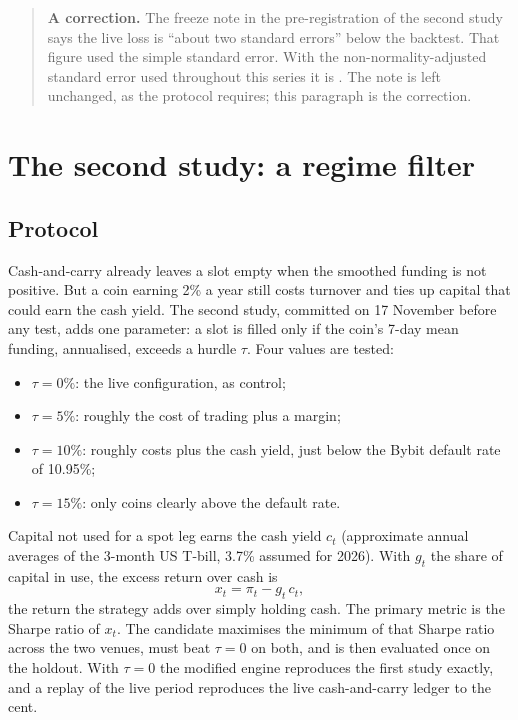 \documentclass[11pt,a4paper]{article}
\begin{document}
\begin{quote}\small
\textbf{A correction.} The freeze note in the pre-registration of the second study
says the live loss is ``about two standard errors'' below the backtest. That figure
used the simple standard error. With the non-normality-adjusted standard error used
throughout this series it is \LiveZ. The note is left unchanged, as the protocol
requires; this paragraph is the correction.
\end{quote}

\section{The second study: a regime filter}\label{sec:study2}

\subsection{Protocol}

Cash-and-carry already leaves a slot empty when the smoothed funding is not positive.
But a coin earning 2\% a year still costs turnover and ties up capital that could earn
the cash yield. The second study, committed on 17 November before any test, adds one
parameter: a slot is filled only if the coin's 7-day mean funding, annualised, exceeds a
hurdle $\tau$. Four values are tested:

\begin{itemize}
  \item $\tau=0\%$: the live configuration, as control;
  \item $\tau=5\%$: roughly the cost of trading plus a margin;
  \item $\tau=10\%$: roughly costs plus the cash yield, just below the Bybit default
  rate of 10.95\%;
  \item $\tau=15\%$: only coins clearly above the default rate.
\end{itemize}

Capital not used for a spot leg earns the cash yield $c_t$ (approximate annual
averages of the 3-month US T-bill, 3.7\% assumed for 2026). With $g_t$ the share of
capital in use, the excess return over cash is
\begin{equation}
  x_t = \pi_t - g_t\,c_t ,
\end{equation}
the return the strategy adds over simply holding cash. The primary metric is the Sharpe
ratio of $x_t$. The candidate maximises the minimum of that Sharpe ratio across the two
venues, must beat $\tau=0$ on both, and is then evaluated once on the holdout. With
$\tau=0$ the modified engine reproduces the first study exactly, and a replay of the
live period reproduces the live cash-and-carry ledger to the cent.
\end{document}
